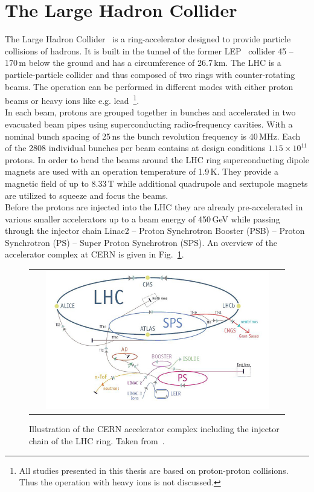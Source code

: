 \section{The Large Hadron Collider}
\label{sec:lhc}
The Large Hadron Collider~\cite{Bruning:782076, 1748-0221-3-08-S08001} is a ring-accelerator designed to provide particle collisions of hadrons. It is built in the tunnel of the former LEP~\cite{LEPdesign} collider 45 -- 170\,m below the ground and has a circumference of 26.7\,km. The LHC is a particle-particle collider and thus composed of two rings with counter-rotating beams. The operation can be performed in different modes with either proton beams or heavy ions like e.g. lead~\footnote{All studies presented in this thesis are based on proton-proton collisions. Thus the operation with heavy ions is not discussed.}. \\
In each beam, protons are grouped together in bunches and accelerated in two evacuated beam pipes using superconducting radio-frequency cavities. With a nominal bunch spacing of 25\,ns the bunch revolution frequency is 40\,MHz. Each of the 2808 individual bunches per beam contains at design conditions $1.15 \times 10^{11}$ protons. In order to bend the beams around the LHC ring superconducting dipole magnets are used with an operation temperature of 1.9\,K. They provide a magnetic field of up to 8.33\,T while additional quadrupole and sextupole magnets are utilized to squeeze and focus the beams.\\  
Before the protons are injected into the LHC they are already pre-accelerated in various smaller accelerators up to a beam energy of 450\,GeV while passing through the injector chain Linac2 -- Proton Synchrotron Booster (PSB) -- Proton Synchrotron (PS) -- Super Proton Synchrotron (SPS). An overview of the accelerator complex at CERN is given in Fig.~\ref{fig:AccComplex}.
\begin{figure}[!tp]
  \centering
  \begin{tabular}{c}
    \includegraphics[width=0.9\textwidth]{figures/lhc.jpg}
  \end{tabular}
  \caption{Illustration of the CERN accelerator complex including the injector chain of the LHC ring. Taken from~\cite{CERNaccelerators}.}
  \label{fig:AccComplex}
\end{figure}
